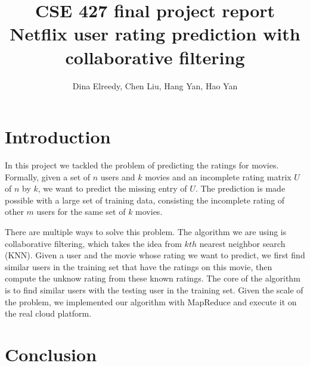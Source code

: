 \documentclass{article}
\title{CSE 427 final project report\\
  Netflix user rating prediction with collaborative filtering}
\author{Dina Elreedy, Chen Liu, Hang Yan, Hao Yan}
\begin{document}
\maketitle
  \section{Introduction}
  In this project we tackled the problem of predicting the ratings for
  movies. Formally, given a set of $n$ users and $k$ movies and an
  incomplete rating matrix $U$ of $n$ by $k$, we want to predict the
  missing entry of $U$. The prediction is made possible with a large
  set of training data, consisting the incomplete rating of other $m$
  users for the same set of $k$ movies.

  There are multiple ways to solve this problem. The algorithm we are
  using is collaborative filtering, which takes the idea from $kth$
  nearest neighbor search (KNN). Given a user and the movie whose
  rating we want to predict, we first find similar users in the
  training set that have the ratings on this movie, then compute the
  unknow rating from these known ratings. The core of the algorithm is
  to find similar users with the testing user in the training
  set. Given the scale of the problem, we implemented our algorithm
  with MapReduce and execute it on the real cloud platform.

  
    
  

  

  

  \section{Conclusion}

  
\end{document}
